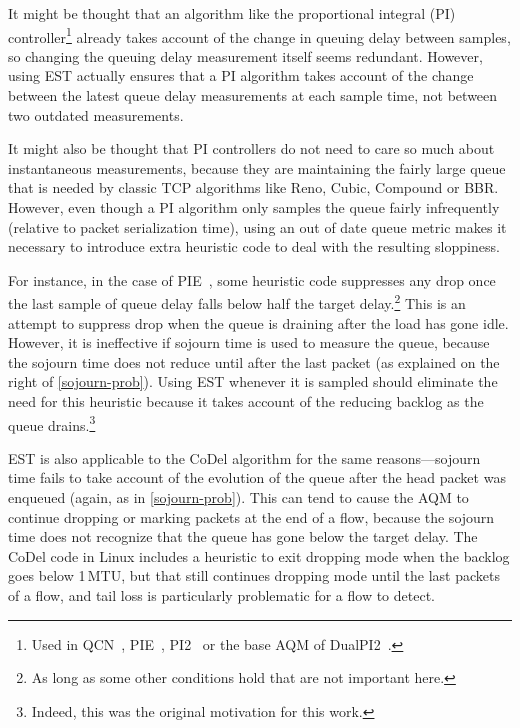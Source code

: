 It might be thought that an algorithm like the proportional integral (PI) controller\footnote{Used in QCN~\cite{IEEE802.1Qau:Ethernet_QCN}, PIE~\cite{Pan17:PIE}, PI2~\cite{DeSchepper16a:PI2} or the base AQM of DualPI2~\cite{Briscoe15e:DualQ-Coupled-AQM_ID}.} already takes account of the change in queuing delay between samples, so changing the queuing delay measurement itself seems redundant. However, using EST actually ensures that a PI algorithm takes account of the change between the latest queue delay measurements at each sample time, not between two outdated measurements.

It might also be thought that PI controllers do not need to care so much about instantaneous measurements, because they are maintaining the fairly large queue that is needed by classic TCP algorithms like Reno, Cubic, Compound or BBR. However, even though a PI algorithm only samples the queue fairly infrequently (relative to packet serialization time), using an out of date queue metric makes it necessary to introduce extra heuristic code to deal with the resulting sloppiness.

For instance, in the case of PIE~\cite{Pan17:PIE}, some heuristic code suppresses any drop once the last sample of queue delay falls below half the target delay.\footnote{As long as some other conditions hold that are not important here.} This is an attempt to suppress drop when the queue is draining after the load has gone idle. However, it is ineffective if sojourn time is used to measure the queue, because the sojourn time does not reduce until after the last packet (as explained on the right of \autoref{sojourn-prob}). Using EST whenever it is sampled should eliminate the need for this heuristic because it takes account of the reducing backlog as the queue drains.\footnote{Indeed, this was the original motivation for this work.}

EST is also applicable to the CoDel algorithm for the same reasons---sojourn time fails to take account of the evolution of the queue after the head packet was enqueued (again, as in \autoref{sojourn-prob}). This can tend to cause the AQM to continue dropping or marking packets at the end of a flow, because the sojourn time does not recognize that the queue has gone below the target delay. The CoDel code in Linux includes a heuristic to exit dropping mode when the backlog goes below 1\,MTU, but that still continues dropping mode until the last packets of a flow, and tail loss is particularly problematic for a flow to detect.

